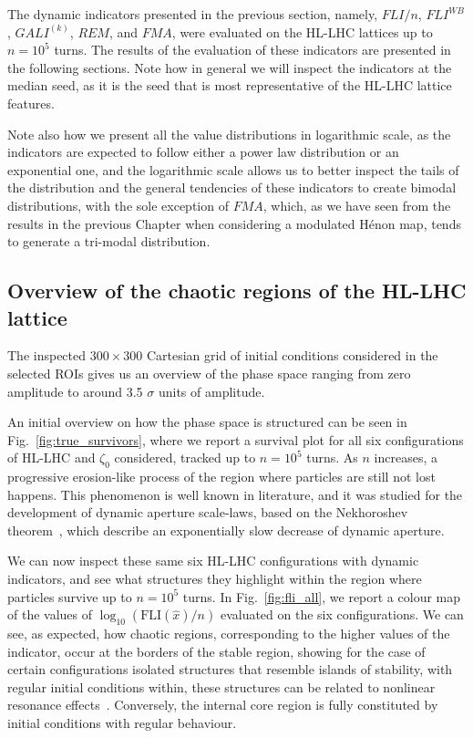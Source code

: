 The dynamic indicators presented in the previous section, namely, $FLI/n$, $FLI^{WB}$, $GALI^{(k)}$, $REM$, and $FMA$, were evaluated on the HL-LHC lattices up to $n=10^5$ turns. The results of the evaluation of these indicators are presented in the following sections. Note how in general we will inspect the indicators at the median seed, as it is the seed that is most representative of the HL-LHC lattice features.

Note also how we present all the value distributions in logarithmic scale, as the indicators are expected to follow either a power law distribution or an exponential one, and the logarithmic scale allows us to better inspect the tails of the distribution and the general tendencies of these indicators to create bimodal distributions, with the sole exception of $FMA$, which, as we have seen from the results in the previous Chapter when considering a modulated Hénon map, tends to generate a tri-modal distribution.


\subsection{Overview of the chaotic regions of the HL-LHC lattice}

The inspected $300\times300$ Cartesian grid of initial conditions considered in the selected ROIs gives us an overview of the phase space ranging from zero amplitude to around 3.5 $\sigma$ units of amplitude.

An initial overview on how the phase space is structured can be seen in Fig.~\ref{fig:true_survivors}, where we report a survival plot for all six configurations of HL-LHC and $\zeta_0$ considered, tracked up to $n=10^5$ turns. As $n$ increases, a progressive erosion-like process of the region where particles are still not lost happens. This phenomenon is well known in literature, and it was studied for the development of dynamic aperture scale-laws, based on the Nekhoroshev theorem~\cite{Bazzani:2019csk}, which describe an exponentially slow decrease of dynamic aperture.

We can now inspect these same six HL-LHC configurations with dynamic indicators, and see what structures they highlight within the region where particles survive up to $n=10^5$ turns. In Fig.~\ref{fig:fli_all}, we report a colour map of the values of $\log_{10}(\mathrm{FLI}(\hat{x})/n)$ evaluated on the six configurations. We can see, as expected, how chaotic regions, corresponding to the higher values of the indicator, occur at the borders of the stable region, showing for the case of certain configurations isolated structures that resemble islands of stability, with regular initial conditions within, these structures can be related to nonlinear resonance effects~\cite{}. Conversely, the internal core region is fully constituted by initial conditions with regular behaviour.

